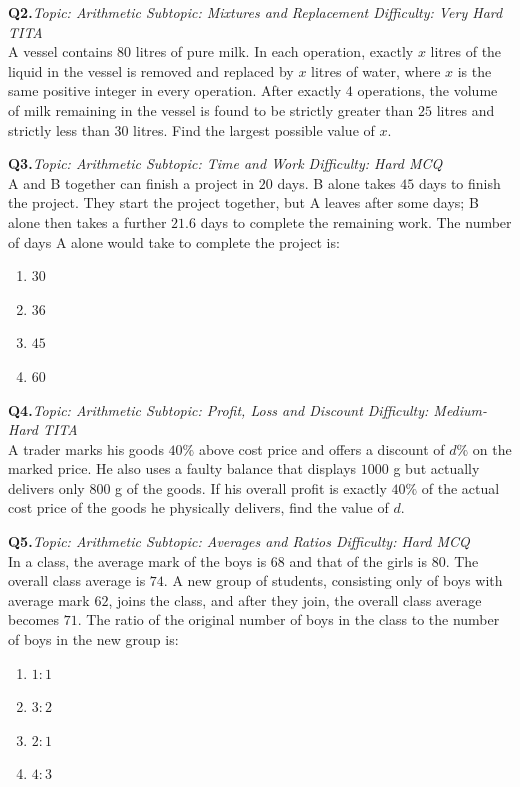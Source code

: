 \documentclass[11pt,a4paper]{article}
\newcommand{\qhead}[4]{%
  \vspace{0.7em}\noindent\textbf{Q#1.}\hfill\textit{Topic: #2 \textbar{} Subtopic: #3 \textbar{} Difficulty: #4}\\[-0.2em]
}
\begin{document}
\qhead{2}{Arithmetic}{Mixtures and Replacement}{Very Hard \textbar{} TITA}
A vessel contains $80$ litres of pure milk. In each operation, exactly $x$ litres of the liquid in the vessel is removed and replaced by $x$ litres of water, where $x$ is the same positive integer in every operation. After exactly $4$ operations, the volume of milk remaining in the vessel is found to be strictly greater than $25$ litres and strictly less than $30$ litres. Find the largest possible value of $x$.

\qhead{3}{Arithmetic}{Time and Work}{Hard \textbar{} MCQ}
A and B together can finish a project in $20$ days. B alone takes $45$ days to finish the project. They start the project together, but A leaves after some days; B alone then takes a further $21.6$ days to complete the remaining work. The number of days A alone would take to complete the project is:
\begin{enumerate}[label=(\Alph*),leftmargin=*]
  \item $30$
  \item $36$
  \item $45$
  \item $60$
\end{enumerate}

\qhead{4}{Arithmetic}{Profit, Loss and Discount}{Medium-Hard \textbar{} TITA}
A trader marks his goods $40\%$ above cost price and offers a discount of $d\%$ on the marked price. He also uses a faulty balance that displays $1000$ g but actually delivers only $800$ g of the goods. If his overall profit is exactly $40\%$ of the actual cost price of the goods he physically delivers, find the value of $d$.

\qhead{5}{Arithmetic}{Averages and Ratios}{Hard \textbar{} MCQ}
In a class, the average mark of the boys is $68$ and that of the girls is $80$. The overall class average is $74$. A new group of students, consisting only of boys with average mark $62$, joins the class, and after they join, the overall class average becomes $71$. The ratio of the original number of boys in the class to the number of boys in the new group is:
\begin{enumerate}[label=(\Alph*),leftmargin=*]
  \item $1:1$
  \item $3:2$
  \item $2:1$
  \item $4:3$
\end{enumerate}

\end{document}
